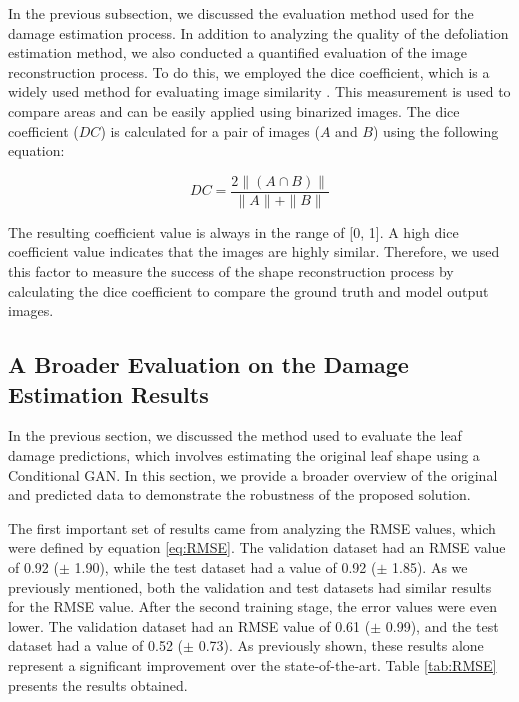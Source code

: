 In the previous subsection, we discussed the evaluation method used for the damage estimation process. In addition to analyzing the quality of the defoliation estimation method, we also conducted a quantified evaluation of the image reconstruction process. To do this, we employed the dice coefficient, which is a widely used method for evaluating image similarity \cite{gencctav2012unsupervised,sampat2009complex,shamir2019continuous,mun2017comparison,nitsch2019automatic}. This measurement is used to compare areas and can be easily applied using binarized images. The dice coefficient ($DC$) is calculated for a pair of images ($A$ and $B$) using the following equation:

\begin{equation}
	\label{eq:dice}
	DC = \frac{2 \|(A \cap B)\|}{\|A\| +\|B\|}
\end{equation}

The resulting coefficient value is always in the range of [0, 1]. A high dice coefficient value indicates that the images are highly similar. Therefore, we used this factor to measure the success of the shape reconstruction process by calculating the dice coefficient to compare the ground truth and model output images.

\subsection{A Broader Evaluation on the Damage Estimation Results}

In the previous section, we discussed the method used to evaluate the leaf damage predictions, which involves estimating the original leaf shape using a Conditional GAN. In this section, we provide a broader overview of the original and predicted data to demonstrate the robustness of the proposed solution.

The first important set of results came from analyzing the RMSE values, which were defined by equation \ref{eq:RMSE}. The validation dataset had an RMSE value of 0.92 ($\pm$ 1.90), while the test dataset had a value of 0.92 ($\pm$ 1.85). As we previously mentioned, both the validation and test datasets had similar results for the RMSE value. After the second training stage, the error values were even lower. The validation dataset had an RMSE value of 0.61 ($\pm$ 0.99), and the test dataset had a value of 0.52 ($\pm$ 0.73). As previously shown, these results alone represent a significant improvement over the state-of-the-art. Table \ref{tab:RMSE} presents the results obtained.

